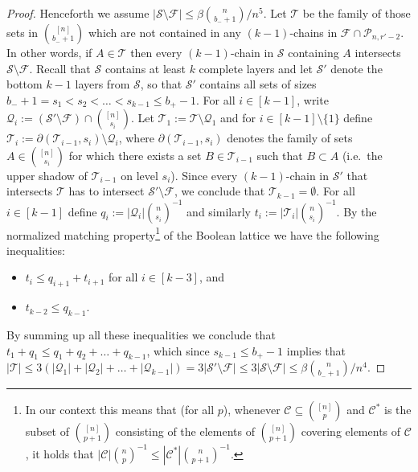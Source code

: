 \documentclass[12pt]{article}
\numberwithin{equation}{section}
\def\C{\mathcal{C}}
\def\F{\mathcal{F}}
\def\P{\mathcal{P}}
\def\Q{\mathcal{Q}}
\def\S{\mathcal{S}}
\def\T{\mathcal{T}}
\begin{document}
\begin{proof}
Henceforth we assume $|\S\setminus \F|\leq \beta\binom{n}{b_-+1}/n^5$.  Let $\T$ be the family of those sets in $\binom{[n]}{b_-+1}$ which are not contained in any $(k-1)$-chains in $\F\cap \P_{n,r'-2}$. In other words, if $A\in\T$ then every $(k-1)$-chain in $\S$ containing $A$ intersects $\S\setminus \F$. Recall that $\S$ contains at least $k$ complete layers and let $\S'$ denote the bottom $k-1$ layers from $\S$, so that $\S'$ contains all sets of sizes $b_-+1=s_1 < s_2 <\ldots < s_{k-1} \leq b_+-1$. For all $i\in [k-1]$, write $\Q_i := (\S'\setminus \F)\cap \binom{[n]}{s_i}$. Let $\T_1:=\T\setminus \Q_1$ and for $i\in [k-1]\setminus \{1\}$ define $\T_i :=\partial (\T_{i-1},s_i)\setminus \Q_i$, where $\partial(\T_{i-1},s_i)$ denotes the family of sets $A\in\binom{[n]}{s_i}$ for which there exists a set $B\in \T_{i-1}$ such that $B\subset A$ (i.e.~the upper shadow of $\T_{i-1}$ on level $s_i$). Since every $(k-1)$-chain in $\S'$ that intersects $\T$ has to intersect $\S'\setminus \F$, we conclude that $\T_{k-1}=\emptyset$. For all $i\in [k-1]$ define $q_i := |\Q_i|\binom{n}{s_i}^{-1}$ and similarly $t_i:=|\T_i|\binom{n}{s_i}^{-1}$. By the normalized matching property\footnote{In our context this means that (for all $p$), whenever $\C\subseteq\binom{[n]}{p}$ and $\C^*$ is the subset of $\binom{[n]}{p+1}$ consisting of the elements of $\binom{[n]}{p+1}$ covering elements of $\C$, it holds that $|\C|\binom{n}{p}^{-1}\leq |\C^*|\binom{n}{p+1}^{-1}$.} of the Boolean lattice we have the following inequalities:
\begin{itemize}
\item $t_i\leq q_{i+1} + t_{i+1}$ for all $i\in [k-3]$, and
\item $t_{k-2}\leq q_{k-1}$.
\end{itemize}
By summing up all these inequalities we conclude that $t_1 + q_1\leq q_1 + q_2 + \ldots + q_{k-1}$, which since $s_{k-1}\leq b_+-1$ implies that $|\T|\leq 3\left(|\Q_1|+|\Q_2|+\ldots + |\Q_{k-1}|\right)=3|\S'\setminus \F|\leq 3|\S\setminus \F|\leq \beta\binom{n}{b_-+1}/n^4$.


\end{proof}
\end{document}
